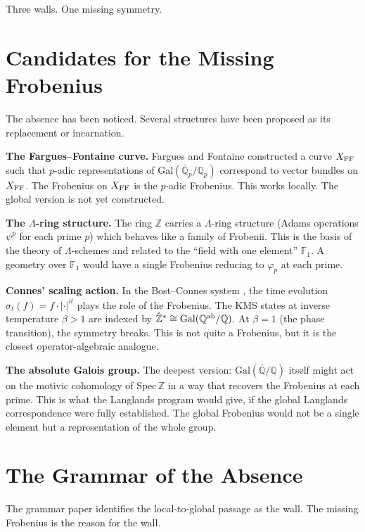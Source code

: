 \documentclass[12pt]{article}
\theoremstyle{definition}
\theoremstyle{remark}
\begin{document}
Three walls.
One missing symmetry.

\section{Candidates for the Missing Frobenius}

The absence has been noticed.
Several structures have been proposed as its replacement or incarnation.

\textbf{The Fargues--Fontaine curve.}
Fargues and Fontaine constructed a curve $X_{\rm FF}$
such that $p$-adic representations of $\mathrm{Gal}(\bar{\mathbb{Q}}_p/\mathbb{Q}_p)$
correspond to vector bundles on $X_{\rm FF}$.
The Frobenius on $X_{\rm FF}$ is the $p$-adic Frobenius.
This works locally. The global version is not yet constructed.

\textbf{The $\Lambda$-ring structure.}
The ring $\mathbb{Z}$ carries a $\Lambda$-ring structure
(Adams operations $\psi^p$ for each prime $p$)
which behaves like a family of Frobenii.
This is the basis of the theory of $\Lambda$-schemes
and related to the ``field with one element'' $\mathbb{F}_1$.
A geometry over $\mathbb{F}_1$ would have a single Frobenius
reducing to $\varphi_p$ at each prime.

\textbf{Connes' scaling action.}
In the Bost--Connes system \cite{bostconnes},
the time evolution $\sigma_t(f) = f \cdot |\cdot|^{it}$
plays the role of the Frobenius.
The KMS states at inverse temperature $\beta > 1$
are indexed by $\hat{\mathbb{Z}}^* \cong \mathrm{Gal}(\mathbb{Q}^{\rm ab}/\mathbb{Q})$.
At $\beta = 1$ (the phase transition), the symmetry breaks.
This is not quite a Frobenius, but it is the closest
operator-algebraic analogue.

\textbf{The absolute Galois group.}
The deepest version: $\mathrm{Gal}(\bar{\mathbb{Q}}/\mathbb{Q})$ itself
might act on the motivic cohomology of $\mathrm{Spec}\,\mathbb{Z}$
in a way that recovers the Frobenius at each prime.
This is what the Langlands program would give,
if the global Langlands correspondence were fully established.
The global Frobenius would not be a single element
but a representation of the whole group.

\section{The Grammar of the Absence}

The grammar paper \cite{grammar} identifies the local-to-global passage
as the wall.
The missing Frobenius is the reason for the wall.
\end{document}

